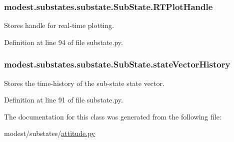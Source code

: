 \subsubsection[{\texorpdfstring{R\+T\+Plot\+Handle}{RTPlotHandle}}]{\setlength{\rightskip}{0pt plus 5cm}modest.\+substates.\+substate.\+Sub\+State.\+R\+T\+Plot\+Handle\hspace{0.3cm}{\ttfamily [inherited]}}\hypertarget{classmodest_1_1substates_1_1substate_1_1SubState_a37ded775b84cea85b4dce0f1b16286c4}{}\label{classmodest_1_1substates_1_1substate_1_1SubState_a37ded775b84cea85b4dce0f1b16286c4}


Stores handle for real-\/time plotting. 



Definition at line 94 of file substate.\+py.

\subsubsection[{\texorpdfstring{state\+Vector\+History}{stateVectorHistory}}]{\setlength{\rightskip}{0pt plus 5cm}modest.\+substates.\+substate.\+Sub\+State.\+state\+Vector\+History\hspace{0.3cm}{\ttfamily [inherited]}}\hypertarget{classmodest_1_1substates_1_1substate_1_1SubState_a38c12c9d0899bc1161f3502b584517a2}{}\label{classmodest_1_1substates_1_1substate_1_1SubState_a38c12c9d0899bc1161f3502b584517a2}


Stores the time-\/history of the sub-\/state state vector. 



Definition at line 91 of file substate.\+py.



The documentation for this class was generated from the following file\+:\begin{DoxyCompactItemize}
\item 
modest/substates/\hyperlink{attitude_8py}{attitude.\+py}\end{DoxyCompactItemize}
